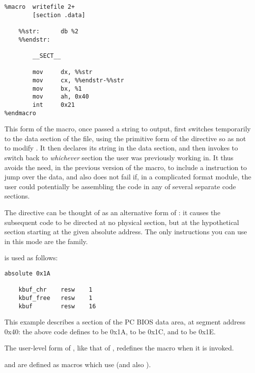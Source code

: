\begin{lstlisting}
%macro  writefile 2+
        [section .data]

    %%str:      db %2
    %%endstr:

        __SECT__

        mov     dx, %%str
        mov     cx, %%endstr-%%str
        mov     bx, %1
        mov     ah, 0x40
        int     0x21
%endmacro
\end{lstlisting}

This form of the macro, once passed a string to output, first
switches temporarily to the data section of the file, using the
primitive form of the  directive so as not to modify
. It then declares its string in the data section,
and then invokes  to switch back to \emph{whichever}
section the user was previously working in. It thus avoids the need,
in the previous version of the macro, to include a  instruction
to jump over the data, and also does not fail if, in a complicated
 format module, the user could potentially be assembling the
code in any of several separate code sections.


The  directive can be thought of as an alternative form
of : it causes the subsequent code to be directed at no
physical section, but at the hypothetical section starting at the
given absolute address. The only instructions you can use in this
mode are the  family.

 is used as follows:

\begin{lstlisting}
absolute 0x1A

    kbuf_chr    resw    1
    kbuf_free   resw    1
    kbuf        resw    16
\end{lstlisting}

This example describes a section of the PC BIOS data area, at
segment address 0x40: the above code defines  to be
0x1A,  to be 0x1C, and  to be 0x1E.

The user-level form of , like that of ,
redefines the  macro when it is invoked.

 and  are defined as macros
which use  (and also ).

